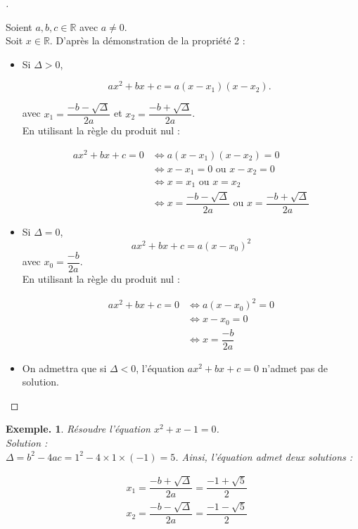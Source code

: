 \documentclass[12pt]{article}
\theoremstyle{break}
\newtheorem*{example}{Exemple.}
\newenvironment{demo}[1][\proofname]{%
  \begin{proof}[#1]$ $\newline
}{%
  \end{proof}
}
\begin{document}
\newpage
\begin{demo}
Soient $a, b, c \in \mathbb{R}$ avec $a \neq 0$.\\
Soit $x \in \mathbb{R}$. D'après la démonstration de la propriété 2 :

\begin{itemize}
  \item Si $\Delta>0$,

$$
a x^{2}+b x+c=a\left(x-x_{1}\right)\left(x-x_{2}\right) \text {. }
$$

avec $x_{1}=\dfrac{-b-\sqrt{\Delta}}{2 a}$ et $x_{2}=\dfrac{-b+\sqrt{\Delta}}{2 a}$.\\
En utilisant la règle du produit nul :

$$
\begin{aligned}
a x^{2}+b x+c=0 & \Longleftrightarrow a\left(x-x_{1}\right)\left(x-x_{2}\right)=0 \\
& \Longleftrightarrow x-x_{1}=0 \text { ou } x-x_{2}=0 \\
& \Longleftrightarrow x=x_{1} \text { ou } x=x_{2} \\
& \Longleftrightarrow x=\dfrac{-b-\sqrt{\Delta}}{2 a} \text { ou } x=\dfrac{-b+\sqrt{\Delta}}{2 a}
\end{aligned}
$$

  \item Si $\Delta=0$,
  $$
    a x^{2}+b x+c=a\left(x-x_{0}\right)^{2}
  $$
  avec $x_{0}=\dfrac{-b}{2 a}$.\\

En utilisant la règle du produit nul :

$$
\begin{aligned}
a x^{2}+b x+c=0 & \Longleftrightarrow a\left(x-x_{0}\right)^{2}=0 \\
& \Longleftrightarrow x-x_{0}=0 \\
& \Longleftrightarrow x=\dfrac{-b}{2 a}
\end{aligned}
$$

  \item On admettra que si $\Delta<0$, l'équation $a x^{2}+b x+c=0$ n'admet pas de solution.
\end{itemize}
\end{demo}

\begin{example}
Résoudre l'équation $x^{2}+x-1=0$.\\
Solution :\\
$\Delta=b^{2}-4 a c=1^{2}-4 \times 1 \times(-1)=5$. Ainsi, l'équation admet deux solutions :

$$
\begin{aligned}
& x_{1}=\dfrac{-b+\sqrt{\Delta}}{2 a}=\dfrac{-1+\sqrt{5}}{2} \\
& x_{2}=\dfrac{-b-\sqrt{\Delta}}{2 a}=\dfrac{-1-\sqrt{5}}{2}
\end{aligned}
$$
\end{example}
\end{document}
